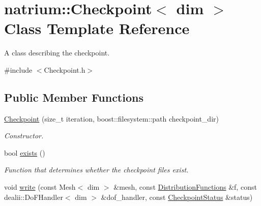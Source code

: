 \hypertarget{classnatrium_1_1Checkpoint}{
\section{natrium::Checkpoint$<$ dim $>$ Class Template Reference}
\label{classnatrium_1_1Checkpoint}
}


A class describing the checkpoint.  


{\ttfamily \#include $<$Checkpoint.h$>$}\subsection*{Public Member Functions}
\begin{DoxyCompactItemize}
\item 
\hyperlink{classnatrium_1_1Checkpoint_a8d5798dea2e38acce751dd1194d76c27}{Checkpoint} (size\_\-t iteration, boost::filesystem::path checkpoint\_\-dir)
\begin{DoxyCompactList}\small\item\em Constructor. \item\end{DoxyCompactList}\item 
bool \hyperlink{classnatrium_1_1Checkpoint_a43f7d305056ef5eab7a2efea2cdaebe5}{exists} ()
\begin{DoxyCompactList}\small\item\em Function that determines whether the checkpoint files exist. \item\end{DoxyCompactList}\item 
\hypertarget{classnatrium_1_1Checkpoint_a6c3eae90337f91948b4b17ad2456258c}{
void \hyperlink{classnatrium_1_1Checkpoint_a6c3eae90337f91948b4b17ad2456258c}{write} (const Mesh$<$ dim $>$ \&mesh, const \hyperlink{classnatrium_1_1DistributionFunctions}{DistributionFunctions} \&f, const dealii::DoFHandler$<$ dim $>$ \&dof\_\-handler, const \hyperlink{structnatrium_1_1CheckpointStatus}{CheckpointStatus} \&status)}
\label{classnatrium_1_1Checkpoint_a6c3eae90337f91948b4b17ad2456258c}


\end{DoxyCompactItemize}
